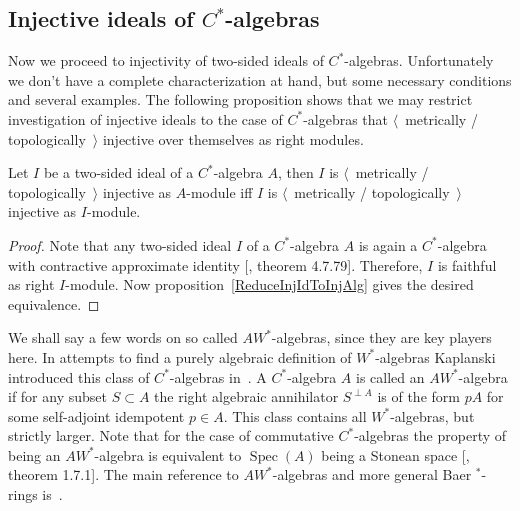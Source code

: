 
\subsection{
    Injective ideals of \texorpdfstring{$C^*$}{C*}-algebras}\label{
SubSectionInjectiveIdealsOfCStarAlgebras}

Now we proceed to injectivity of two-sided ideals of $C^*$-algebras.
Unfortunately we don't have a complete characterization at hand, but some
necessary conditions and several examples. The following proposition shows that
we may restrict investigation of injective ideals to the case of $C^*$-algebras
that $\langle$~metrically / topologically~$\rangle$ injective over themselves as
right modules.

\begin{proposition}\label{MetTopInjOvrAlgIffOvrItslf} Let $I$ be a two-sided
ideal of a $C^*$-algebra $A$, then $I$ is $\langle$~metrically /
topologically~$\rangle$ injective as $A$-module iff $I$ is $\langle$~metrically
/ topologically~$\rangle$ injective as $I$-module.
\end{proposition}
\begin{proof} Note that any two-sided ideal $I$ of a $C^*$-algebra $A$ is again
a $C^*$-algebra with contractive approximate identity [\cite{HelBanLocConvAlg},
theorem 4.7.79]. Therefore, $I$ is faithful as right $I$-module. Now
proposition~\ref{ReduceInjIdToInjAlg} gives the desired equivalence.
\end{proof}

We shall say a few words on so called $AW^*$-algebras, since they are key
players here. In attempts to find a purely algebraic definition of
$W^*$-algebras Kaplanski introduced this class of $C^*$-algebras
in~\cite{KaplProjInBanAlg}. A $C^*$-algebra $A$ is called an $AW^*$-algebra if
for any subset $S\subset A$ the right algebraic annihilator
$S^{\perp A}$ is of the form $pA$ for
some self-adjoint idempotent $p\in A$. This class contains all $W^*$-algebras,
but strictly larger. Note that for the case of commutative $C^*$-algebras the
property of being an $AW^*$-algebra is equivalent to  $\operatorname{Spec}(A)$
being a Stonean space [\cite{BerbBaerStarRings}, theorem 1.7.1]. The main
reference to $AW^*$-algebras and more general Baer ${}^*$-rings
is~\cite{BerbBaerStarRings}. 

